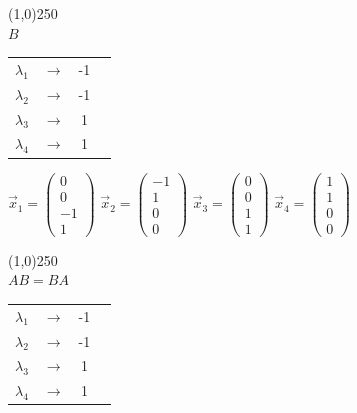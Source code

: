 \documentclass[12pt]{scrreprt}
\begin{document}
\pagebreak

  \begin{center}
  \line(1,0){250}\\
  \textbf{$B$}
  \end{center}

  \begin{center}
  \begin{tabular}{ c c c p{5cm} }
    $\lambda_1$ & $\rightarrow$ & -1 \\        
    $\lambda_2$ & $\rightarrow$ & -1 \\
    $\lambda_3$ & $\rightarrow$ &  1 \\
    $\lambda_4$ & $\rightarrow$ &  1 \\
  \end{tabular}
  \end{center}

  \begin{center}
  $\vec{x}_1 = \begin{pmatrix}0\\ 0 \\ -1 \\ 1 \end{pmatrix}$
  $\vec{x}_2 = \begin{pmatrix}-1\\ 1 \\ 0 \\ 0 \end{pmatrix}$
  $\vec{x}_3 = \begin{pmatrix}0\\ 0 \\ 1 \\ 1 \end{pmatrix}$
  $\vec{x}_4 = \begin{pmatrix}1\\ 1 \\ 0 \\ 0 \end{pmatrix}$
  \end{center}

  \begin{center}
  \line(1,0){250}\\
  \textbf{$AB = BA$}
  \end{center}

  \begin{center}
  \begin{tabular}{ c c c p{5cm} }
    $\lambda_1$ & $\rightarrow$ & -1 \\        
    $\lambda_2$ & $\rightarrow$ & -1 \\
    $\lambda_3$ & $\rightarrow$ &  1 \\
    $\lambda_4$ & $\rightarrow$ &  1 \\
  \end{tabular}
  \end{center}
\end{document}

